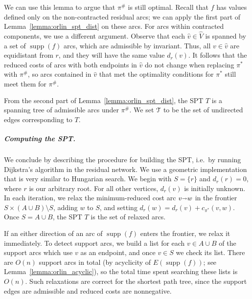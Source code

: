 \documentclass[a4paper,UKenglish]{socg-lipics-v2018}
\def\arcto{\mathord\shortrightarrow}
\def\arc#1#2{#1\arcto#2}
\def\supp{\operatorname{supp}}
\theoremstyle{plain}
\numberwithin{figure}{section}
\renewcommand{\paragraph}{\subparagraph}
\begin{document}
\begin{toappendix}
We can use this lemma to argue that $\pi^\#$ is still optimal.
Recall that $f$ has values defined only on the non-contracted residual arcs;
we can apply the first part of Lemma~\ref{lemma:orlin_spt_dist} on these arcs.
For arcs within contracted components, we use a different argument.
Observe that each $\hat{v} \in \hat{V}$ is spanned by a set of $\supp(f)$ arcs,
which are admissible by invariant.
Thus, all $v \in \hat{v}$ are equidistant from $r$, and they will have the same
value $d_r(v)$.
It follows that the reduced costs of arcs with both endpoints in $\hat{v}$
do not change when replacing $\pi^*$ with $\pi^\#$, so arcs contained in
$\hat{v}$ that met the optimality conditions for $\pi^*$ still meet them for
$\pi^\#$.

From the second part of Lemma~\ref{lemma:orlin_spt_dist}, the SPT $T$ is a
spanning tree of admissible arcs under $\pi^\#$.
We set $\EuScript{T}$ to be the set of undirected edges corresponding to $T$.

\paragraph{Computing the SPT.}
We conclude by describing the procedure for building the SPT, i.e.\ by
running Dijkstra's algorithm in the residual network.
We use a geometric implementation that is very similar to Hungarian search.
We begin with $S = \{r\}$ and $d_r(r) = 0$, where $r$ is our arbitrary root.
For all other vertices, $d_r(v)$ is initially unknown.
In each iteration, we relax the minimum-reduced cost arc $\arc vw$ in the
frontier $S \times (A \cup B) \setminus S$, adding $w$ to $S$, and setting
$d_r(w) = d_r(v) + c_{\pi^*}(v, w)$.
Once $S = A \cup B$, the SPT $T$ is the set of relaxed arcs.

If an either direction of an arc of $\supp(f)$ enters the frontier, we relax it
immediately.
To detect support arcs, we build a list for each $v \in A \cup B$ of the
support arcs which use $v$ as an endpoint, and once $v \in S$ we check its list.
There are $O(n)$ support arcs in total (by acyclicity of $E(\supp(f))$; see Lemma~\ref{lemma:orlin_acyclic}), so
the total time spent searching these lists is $O(n)$.
Such relaxations are correct for the shortest path tree, since the support
edges are admissible and reduced costs are nonnegative.


\end{toappendix}
\end{document}
